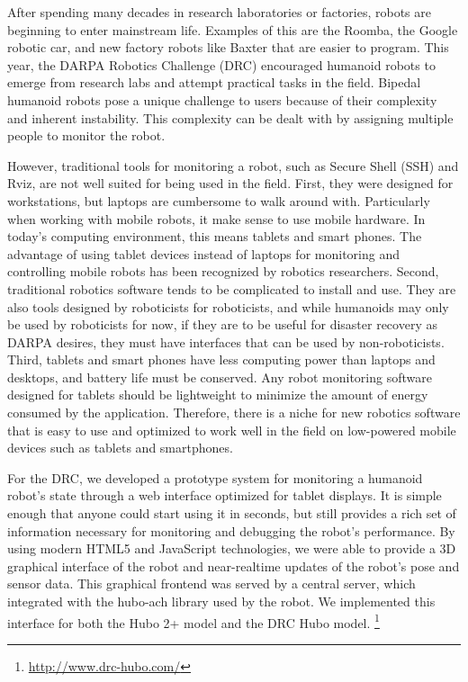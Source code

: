 \documentclass[letterpaper, 10 pt, conference]{ieee/ieeeconf}  %
\begin{document}

After spending many decades in research laboratories or factories, robots are beginning to enter mainstream life.
Examples of this are the Roomba, the Google robotic car, and new factory robots like Baxter that are easier to program.
This year, the DARPA Robotics Challenge (DRC) encouraged humanoid robots to emerge from research labs and attempt practical tasks in the field.
Bipedal humanoid robots pose a unique challenge to users because of their complexity and inherent instability.
This complexity can be dealt with by assigning multiple people to monitor the robot.

However, traditional tools for monitoring a robot, such as Secure Shell (SSH) and Rviz, are not well suited for being used in the field.
First, they were designed for workstations, but laptops are cumbersome to walk around with.
Particularly when working with mobile robots, it make sense to use mobile hardware.
In today's computing environment, this means tablets and smart phones.
The advantage of using tablet devices instead of laptops for monitoring and controlling mobile robots has been recognized by robotics researchers. \cite{speerslightweight}
Second, traditional robotics software tends to be complicated to install and use.
They are also tools designed by roboticists for roboticists, and while humanoids may only be used by roboticists for now, if they are to be useful for disaster recovery as DARPA desires, they must have interfaces that can be used by non-roboticists.
Third, tablets and smart phones have less computing power than laptops and desktops, and battery life must be conserved.
Any robot monitoring software designed for tablets should be lightweight to minimize the amount of energy consumed by the application.
Therefore, there is a niche for new robotics software that is easy to use and optimized to work well in the field on low-powered mobile devices such as tablets and smartphones.

For the DRC, we developed a prototype system for monitoring a humanoid robot's state through a web interface optimized for tablet displays.
It is simple enough that anyone could start using it in seconds, but still provides a rich set of information necessary for monitoring and debugging the robot's performance.
By using modern HTML5 and JavaScript technologies, we were able to provide a 3D graphical interface of the robot and near-realtime updates of the robot's pose and sensor data.
This graphical frontend was served by a central server, which integrated with the hubo-ach library used by the robot.
We implemented this interface for both the Hubo 2+ model and the DRC Hubo model. \cite{park2007mechanical} \footnote{\url{http://www.drc-hubo.com/}}
\end{document}
